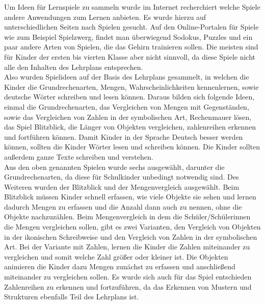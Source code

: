 Um Ideen für Lernspiele zu sammeln wurde im Internet recherchiert welche Spiele andere Anwendungen zum Lernen anbieten. Es wurde hierzu auf unterschiedlichen Seiten nach Spielen gesucht. Auf den Online-Portalen für Spiele wie zum Beispiel Spielzwerg, findet man überwiegend Sodokus, Puzzles und ein paar andere Arten von Spielen, die das Gehirn trainieren sollen. Die meisten sind für Kinder der ersten bis vierten Klasse aber nicht sinnvoll, da diese Spiele nicht alle den Inhalten des Lehrplans entsprechen.\\
Also wurden Spielideen auf der Basis des Lehrplans gesammelt, in welchen die Kinder die Grundrechenarten, Mengen, Wahrscheinlichkeiten kennenlernen, sowie deutsche Wörter schreiben und lesen können. Daraus bilden sich folgende Ideen, einmal die Grundrechenarten, das Vergleichen von Mengen mit Gegenständen, sowie das Vergleichen von Zahlen in der symbolischen Art, Rechenmauer lösen, das Spiel Blitzblick, die Länger von Objekten vergleichen, zahlenreihen erkennen und fortführen können. Damit Kinder in der Sprache Deutsch besser werden können, sollten die Kinder Wörter lesen und schreiben können. Die Kinder sollten außerdem ganze Texte schreiben und verstehen.\\
Aus den oben genannten Spielen wurde sechs ausgewählt, darunter die Grundrechenarten, da diese für Schulkinder unbedingt notwendig sind. Des Weiteren wurden der Blitzblick und der Mengenvergleich ausgewählt. Beim Blitzblick müssen Kinder schnell erfassen, wie viele Objekte sie sehen und lernen dadurch Mengen zu erfassen und die Anzahl dann auch zu nennen, ohne die Objekte nachzuzählen. Beim Mengenvergleich in dem die Schüler/Schülerinnen die Mengen vergleichen sollen, gibt es zwei Varianten, den Vergleich von Objekten in der ikonischen Schreibweise und den Vergleich von Zahlen in der symbolischen Art. Bei der Variante mit Zahlen, lernen die Kinder die Zahlen miteinander zu vergleichen und somit welche Zahl größer oder kleiner ist. Die Objekten animieren die Kinder dazu Mengen zunächst zu erfassen und anschließend miteinander zu vergleichen sollen. Es wurde sich auch für das Spiel entschieden Zahlenreihen zu erkennen und fortzuführen, da das Erkennen von Mustern und Strukturen ebenfalls Teil des Lehrplans ist. %
